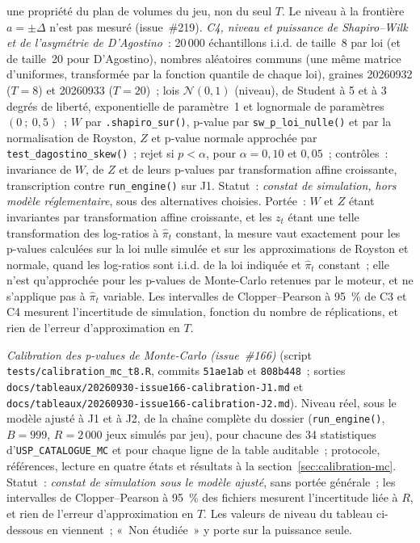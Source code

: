 \documentclass[a4paper,11pt]{article}
\newcommand{\code}[1]{\texttt{\small #1}}
\begin{document}
une propriété du plan de volumes du jeu, non du seul $T$. Le niveau à la frontière $a = \pm\Delta$
n'est pas mesuré (issue~\#219). \emph{C4, niveau et puissance de
Shapiro--Wilk et de l'asymétrie de D'Agostino}~: 20\,000 échantillons i.i.d. de taille~8 par loi
(et de taille~20 pour D'Agostino), nombres aléatoires communs (une même matrice d'uniformes,
transformée par la fonction quantile de chaque loi), graines 20260932 ($T = 8$) et 20260933
($T = 20$)~; lois $\mathcal{N}(0,1)$ (niveau), de Student à 5 et à 3 degrés de liberté,
exponentielle de paramètre~1 et lognormale de paramètres $(0~;~0{,}5)$~; $W$ par
\code{.shapiro\_sur()}, p-value par \code{sw\_p\_loi\_nulle()} et par la normalisation de Royston,
$Z$ et p-value normale approchée par \code{test\_dagostino\_skew()}~; rejet si $p < \alpha$, pour
$\alpha = 0{,}10$ et $0{,}05$~; contrôles~: invariance de $W$, de $Z$ et de leurs p-values par
transformation affine croissante, transcription contre \code{run\_engine()} sur J1. Statut~:
\emph{constat de simulation, hors modèle réglementaire}, sous des alternatives choisies. Portée~:
$W$ et $Z$ étant invariantes par transformation affine croissante, et les $z_t$ étant une telle
transformation des log-ratios à $\hat\pi_t$ constant, la mesure vaut exactement pour les p-values
calculées sur la loi nulle simulée et sur les approximations de Royston et normale, quand les
log-ratios sont i.i.d. de la loi indiquée et $\hat\pi_t$ constant~; elle n'est qu'approchée pour
les p-values de Monte-Carlo retenues par le moteur, et ne s'applique pas à $\hat\pi_t$ variable.
Les intervalles de Clopper--Pearson à 95~\% de C3 et C4 mesurent l'incertitude de simulation,
fonction du nombre de réplications, et rien de l'erreur d'approximation en $T$.

\noindent\emph{Calibration des p-values de Monte-Carlo (issue~\#166)} (script
\code{tests/calibration\_mc\_t8.R}, commits \code{51ae1ab} et \code{808b448}~; sorties
\code{docs/tableaux/}\newline \code{20260930-issue166-calibration-J1.md} et
\code{docs/tableaux/}\newline \code{20260930-issue166-calibration-J2.md}). Niveau réel, sous le
modèle ajusté à J1 et à J2, de la chaîne complète du dossier (\code{run\_engine()}, $B = 999$,
$R = 2\,000$ jeux simulés par jeu), pour chacune des 34 statistiques d'\code{USP\_CATALOGUE\_MC}
et pour chaque ligne de la table auditable~; protocole, références, lecture en quatre états et
résultats à la section~\ref{sec:calibration-mc}. Statut~: \emph{constat de simulation sous le
modèle ajusté}, sans portée générale~; les intervalles de Clopper--Pearson à 95~\% des fichiers
mesurent l'incertitude liée à $R$, et rien de l'erreur d'approximation en $T$. Les valeurs de
niveau du tableau ci-dessous en viennent~; «~Non étudiée~» y porte sur la puissance seule.
\end{document}
